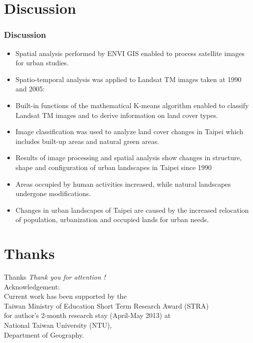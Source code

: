 \documentclass[pdflatex,compress,8pt,
	xcolor={dvipsnames,dvipsnames,svgnames,x11names,table},
	hyperref={	
	breaklinks = true, 
	pdfauthor={Lemenkova Polina}, 
	pdfsubject={Preentation}, 
	pdfcreator={Lemenkova Polina}, 
	pdfproducer={Lemenkova Polina}, 
	colorlinks=true,
	linkcolor=Gold1, 
	citecolor=NavyBlue, 
	urlcolor = NavyBlue, 
	breaklinks = true}]{beamer}
\begin{document}
\section{Discussion}
\begin{frame}\frametitle{Discussion}
\begin{itemize}
	\item Spatial analysis performed by ENVI GIS enabled to process satellite images for urban studies. 
	\item Spatio-temporal analysis was applied to Landsat TM images taken at 1990 and 2005: 
	\item Built-in functions of the mathematical K-means algorithm enabled to classify Landsat TM images and to derive information on land cover types.
	\item Image classification was used to analyze land cover changes in Taipei which includes built-up areas and natural green areas.
	\item Results of image processing and spatial analysis show changes in structure, shape and configuration of urban landscapes in Taipei since 1990
	\item Areas occupied by human activities increased, while natural landscapes undergone modifications.
	\item Changes in urban landscapes of Taipei are caused by the increased relocation of population, urbanization and occupied lands for urban needs.
\end{itemize}
\end{frame}

\section{Thanks}
\begin{frame}{Thanks}
  	\centering \LARGE 
	\emph{Thank you for attention !}\\
	\vspace{5em}
\normalsize
Acknowledgement: \\
Current work has been supported by the \\
Taiwan Ministry of Education Short Term Research Award (STRA) \\
for author's 2-month research stay (April-May 2013) at\\
National Taiwan University (NTU), \\
Department of Geography.
\end{frame}

\end{document}

